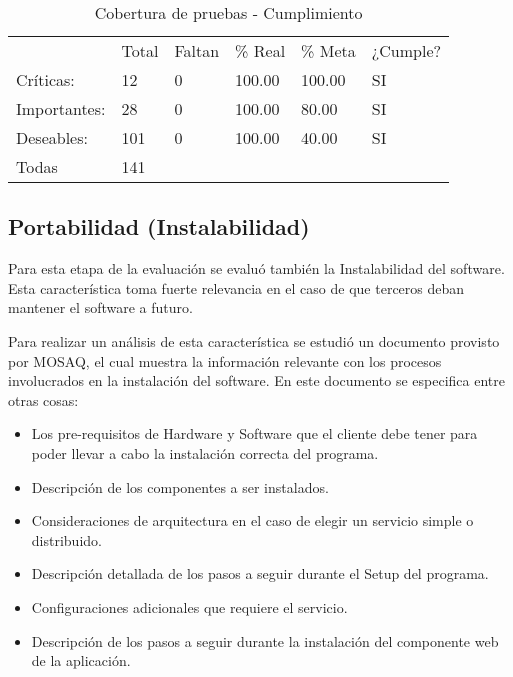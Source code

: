 \begin{table}
  \small
\centering
    \begin{tabular}{llllll}
    ~               &  		Total &  		Faltan &  		\% Real &  		\% Meta & ¿Cumple? \\
     		Críticas:    &  		12    & 0         &  		100.00 &  		100.00 &  		SI    \\
     		Importantes: &  		28    & 0         &  		100.00 &  		80.00  &  		SI    \\
     		Deseables:   &  		101   & 0         &  		100.00 &  		40.00  &  		SI    \\
     		Todas        &  		141   & ~         & ~         & ~         & ~        \\ \hline
    \end{tabular}
         \caption{Cobertura de pruebas - Cumplimiento}
    \label{table:CBC}
\end{table}

\subsection{Portabilidad (Instalabilidad)}
\label{ins}
Para esta etapa de la evaluación se evaluó también la Instalabilidad del software.
Esta característica toma fuerte relevancia en el caso de que terceros deban mantener el software a futuro.

Para realizar un análisis de esta característica se estudió un documento provisto por MOSAQ, el cual
muestra la información relevante con los procesos involucrados en la instalación del software.
En este documento se especifica entre otras cosas:

\begin{itemize}
\item Los pre-requisitos de Hardware y Software que el cliente debe tener para poder llevar a cabo la instalación correcta del programa.
\item Descripción de los componentes a ser instalados.
\item Consideraciones de arquitectura en el caso de elegir un servicio simple o distribuido.
\item Descripción detallada de los pasos a seguir durante el Setup del programa.
\item Configuraciones adicionales que requiere el servicio.
\item Descripción de los pasos a seguir durante la instalación del componente web de la aplicación.
\end{itemize}

